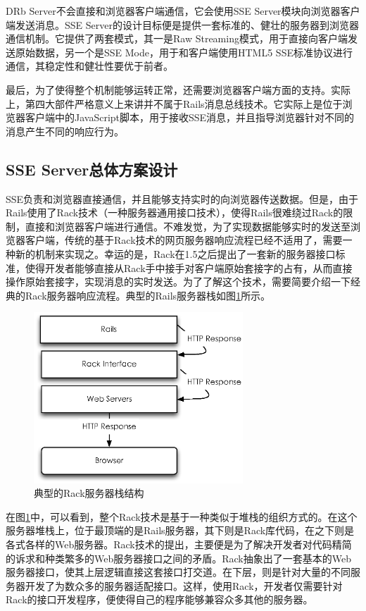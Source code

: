 DRb Server不会直接和浏览器客户端通信，它会使用SSE Server模块向浏览器客户端发送消息。SSE Server的设计目标便是提供一套标准的、健壮的服务器到浏览器通信机制。它提供了两套模式，其一是Raw Streaming模式，用于直接向客户端发送原始数据，另一个是SSE Mode，用于和客户端使用HTML5 SSE标准协议进行通信，其稳定性和健壮性要优于前者。

最后，为了使得整个机制能够运转正常，还需要浏览器客户端方面的支持。实际上，第四大部件严格意义上来讲并不属于Rails消息总线技术。它实际上是位于浏览器客户端中的JavaScript脚本，用于接收SSE消息，并且指导浏览器针对不同的消息产生不同的响应行为。

\subsection{SSE Server总体方案设计}
SSE负责和浏览器直接通信，并且能够支持实时的向浏览器传送数据。但是，由于Rails使用了Rack技术（一种服务器通用接口技术），使得Rails很难绕过Rack的限制，直接和浏览器客户端进行通信。不难发觉，为了实现数据能够实时的发送至浏览器客户端，传统的基于Rack技术的网页服务器响应流程已经不适用了，需要一种新的机制来实现之。幸运的是，Rack在1.5之后提出了一套新的服务器接口标准，使得开发者能够直接从Rack手中接手对客户端原始套接字的占有，从而直接操作原始套接字，实现消息的实时发送。为了了解这个技术，需要简要介绍一下经典的Rack服务器响应流程。典型的Rails服务器栈如图\ref{fig-server-stack}所示。

\begin{figure}[h]
\centering
\includegraphics[width=0.7\textwidth]{images/overview/rack.eps}
\caption{典型的Rack服务器栈结构}
\label{fig-server-stack}
\end{figure}

在图\ref{fig-server-stack}中，可以看到，整个Rack技术是基于一种类似于堆栈的组织方式的。在这个服务器堆栈上，位于最顶端的是Rails服务器，其下则是Rack库代码，在之下则是各式各样的Web服务器。Rack技术的提出，主要便是为了解决开发者对代码精简的诉求和种类繁多的Web服务器接口之间的矛盾。Rack抽象出了一套基本的Web服务器接口，使其上层逻辑直接这套接口打交道。在下层，则是针对大量的不同服务器开发了为数众多的服务器适配接口。这样，使用Rack，开发者仅需要针对Rack的接口开发程序，便使得自己的程序能够兼容众多其他的服务器。

